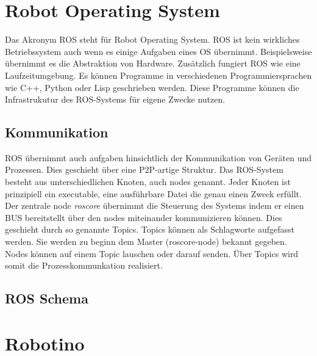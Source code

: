 	\section{Robot Operating System}
	Das Akronym ROS steht für Robot Operating System. ROS ist kein wirkliches Betriebssystem auch wenn es einige Aufgaben eines OS übernimmt. Beispielsweise übernimmt es die Abstraktion von Hardware. Zusätzlich fungiert ROS wie eine Laufzeitumgebung. Es können Programme in verschiedenen Programmiersprachen wie C++, Python oder Lisp geschrieben werden. Diese Programme können die Infrastrukutur des ROS-Systems für eigene Zwecke nutzen.
		\subsection{Kommunikation}
		ROS übernimmt auch aufgaben hinsichtlich der Kommunikation von Geräten und Prozessen. Dies geschieht über eine P2P-artige Struktur. Das ROS-System besteht aus unterschiedlichen Knoten, auch nodes genannt. Jeder Knoten ist prinzipiell ein executable, eine ausführbare Datei die genau einen Zweck erfüllt. Der zentrale node \textit{roscore} übernimmt die Steuerung des Systems indem er einen BUS bereitstellt über den nodes miteinander kommunizieren können. Dies geschieht durch so genannte Topics. Topics können als Schlagworte aufgefasst werden. Sie werden zu beginn dem Master (roscore-node) bekannt gegeben. Nodes können auf einem Topic lauschen oder darauf senden. Über Topics wird somit die Prozesskommunkation realisiert. 
		\subsection{ROS Schema}
		
	\section{Robotino}